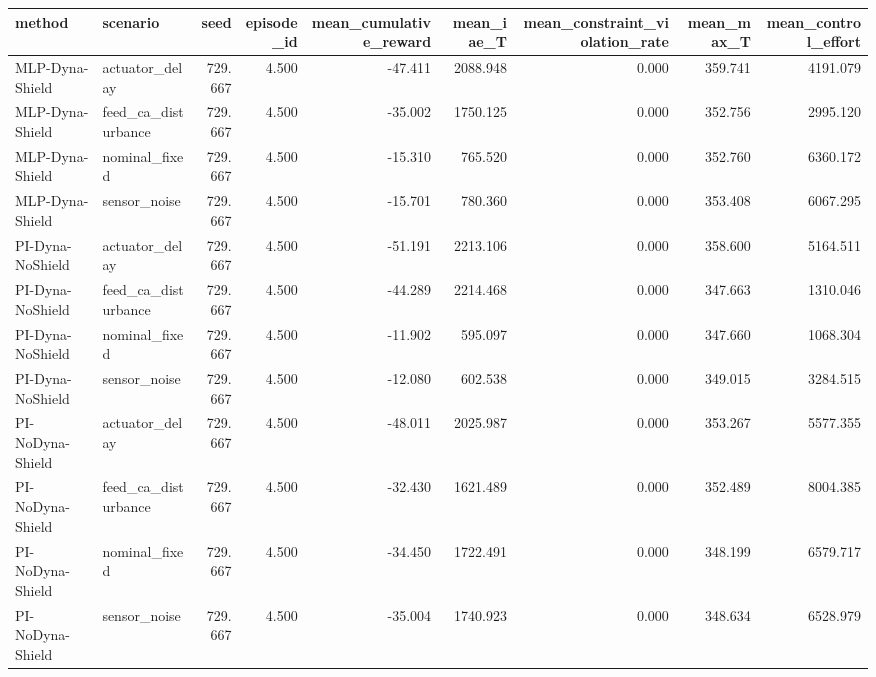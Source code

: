 \begin{tabular}{llrrrrrrr}
\toprule
method & scenario & seed & episode\_id & mean\_cumulative\_reward & mean\_iae\_T & mean\_constraint\_violation\_rate & mean\_max\_T & mean\_control\_effort \\
\midrule
MLP-Dyna-Shield & actuator\_delay & 729.667 & 4.500 & -47.411 & 2088.948 & 0.000 & 359.741 & 4191.079 \\
MLP-Dyna-Shield & feed\_ca\_disturbance & 729.667 & 4.500 & -35.002 & 1750.125 & 0.000 & 352.756 & 2995.120 \\
MLP-Dyna-Shield & nominal\_fixed & 729.667 & 4.500 & -15.310 & 765.520 & 0.000 & 352.760 & 6360.172 \\
MLP-Dyna-Shield & sensor\_noise & 729.667 & 4.500 & -15.701 & 780.360 & 0.000 & 353.408 & 6067.295 \\
PI-Dyna-NoShield & actuator\_delay & 729.667 & 4.500 & -51.191 & 2213.106 & 0.000 & 358.600 & 5164.511 \\
PI-Dyna-NoShield & feed\_ca\_disturbance & 729.667 & 4.500 & -44.289 & 2214.468 & 0.000 & 347.663 & 1310.046 \\
PI-Dyna-NoShield & nominal\_fixed & 729.667 & 4.500 & -11.902 & 595.097 & 0.000 & 347.660 & 1068.304 \\
PI-Dyna-NoShield & sensor\_noise & 729.667 & 4.500 & -12.080 & 602.538 & 0.000 & 349.015 & 3284.515 \\
PI-NoDyna-Shield & actuator\_delay & 729.667 & 4.500 & -48.011 & 2025.987 & 0.000 & 353.267 & 5577.355 \\
PI-NoDyna-Shield & feed\_ca\_disturbance & 729.667 & 4.500 & -32.430 & 1621.489 & 0.000 & 352.489 & 8004.385 \\
PI-NoDyna-Shield & nominal\_fixed & 729.667 & 4.500 & -34.450 & 1722.491 & 0.000 & 348.199 & 6579.717 \\
PI-NoDyna-Shield & sensor\_noise & 729.667 & 4.500 & -35.004 & 1740.923 & 0.000 & 348.634 & 6528.979 \\
\bottomrule
\end{tabular}
